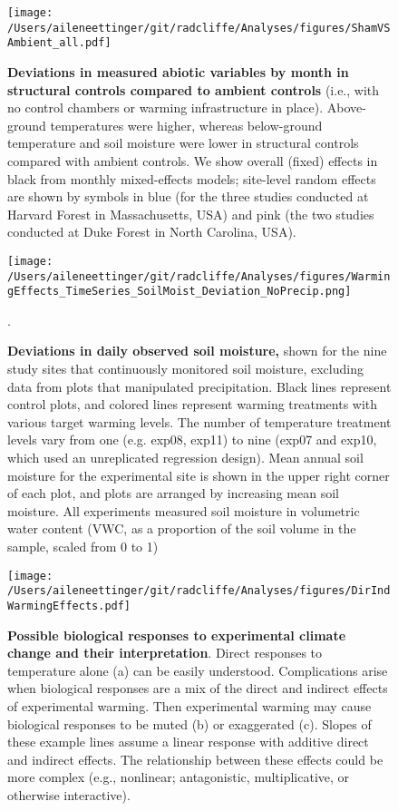 \documentclass{article}
\begin{document}
 \begin{figure}[p]
\centering
 \texttt{[image: /Users/aileneettinger/git/radcliffe/Analyses/figures/ShamVSAmbient\_all.pdf]}  
 \caption{\textbf{Deviations in measured abiotic variables by month in structural controls compared to ambient controls} (i.e., with no control chambers or warming infrastructure in place). Above-ground temperatures were higher, whereas below-ground temperature and soil moisture were lower in structural controls compared with ambient controls. We show overall (fixed) effects in black from monthly mixed-effects models; site-level random effects are shown by symbols in blue (for the three studies conducted at Harvard Forest in Massachusetts, USA) and pink (the two studies conducted at Duke Forest in North Carolina, USA).}
 \label{fig:shamamb}
 \end{figure}
\clearpage
 \begin{figure}[h]
    \centering
 \texttt{[image: /Users/aileneettinger/git/radcliffe/Analyses/figures/WarmingEffects\_TimeSeries\_SoilMoist\_Deviation\_NoPrecip.png]}  
 \caption{\textbf{Deviations in daily observed soil moisture,} shown for the nine study sites that continuously monitored soil moisture, excluding data from plots that manipulated precipitation. Black lines represent control plots, and colored lines represent warming treatments with various target warming levels. The number of temperature treatment levels vary from one (e.g. exp08, exp11) to nine (exp07 and exp10, which used an unreplicated regression design). Mean annual soil moisture for the experimental site is shown in the upper right corner of each plot, and plots are arranged by increasing mean soil moisture. All experiments measured soil moisture in volumetric water content (VWC, as a proportion of the soil volume in the sample, scaled from 0 to 1)}. 
 \label{fig:mois}
 \end{figure}
 
 \begin{figure}[h]
 \texttt{[image: /Users/aileneettinger/git/radcliffe/Analyses/figures/DirIndWarmingEffects.pdf]} 
 \caption{\textbf{Possible biological responses to experimental climate change and their interpretation}. Direct responses to temperature alone (a) can be easily understood. Complications arise when biological responses are a mix of the direct and indirect effects of experimental warming. Then experimental warming may cause biological responses to be muted (b) or exaggerated (c). Slopes of these example lines assume a linear response with additive direct and indirect effects. The relationship between these effects could be more complex (e.g., nonlinear; antagonistic, multiplicative, or otherwise interactive).} 
\label{fig:biolimp}
\end{figure}
\end{document}
